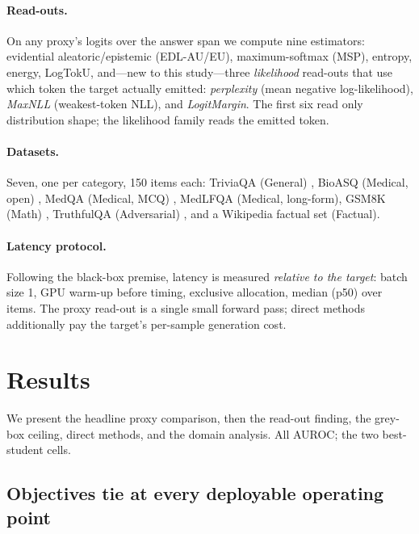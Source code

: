 \documentclass[11pt]{article}
\begin{document}
\paragraph{Read-outs.} On any proxy's logits over the answer span we compute nine
estimators: evidential aleatoric/epistemic (EDL-AU/EU), maximum-softmax (MSP), entropy,
energy, LogTokU, and---new to this study---three \emph{likelihood} read-outs that use
which token the target actually emitted: \emph{perplexity} (mean negative
log-likelihood), \emph{MaxNLL} (weakest-token NLL), and \emph{LogitMargin}. The first
six read only distribution shape; the likelihood family reads the emitted token.

\paragraph{Datasets.} Seven, one per category, 150 items each: TriviaQA (General)
\citep{joshi2017triviaqa}, BioASQ (Medical, open) \citep{tsatsaronis2015bioasq}, MedQA
(Medical, MCQ) \citep{jin2021medqa}, MedLFQA (Medical, long-form), GSM8K (Math)
\citep{cobbe2021gsm8k}, TruthfulQA (Adversarial) \citep{lin2021truthfulqa}, and a
Wikipedia factual set (Factual).

\paragraph{Latency protocol.} Following the black-box premise, latency is measured
\emph{relative to the target}: batch size 1, GPU warm-up before timing, exclusive
allocation, median (p50) over items. The proxy read-out is a single small forward pass;
direct methods additionally pay the target's per-sample generation cost.

\section{Results}\label{sec:results}
We present the headline proxy comparison, then the read-out finding, the grey-box
ceiling, direct methods, and the domain analysis. All AUROC; the two best-student cells.

\subsection{Objectives tie at every deployable operating point}
\end{document}
